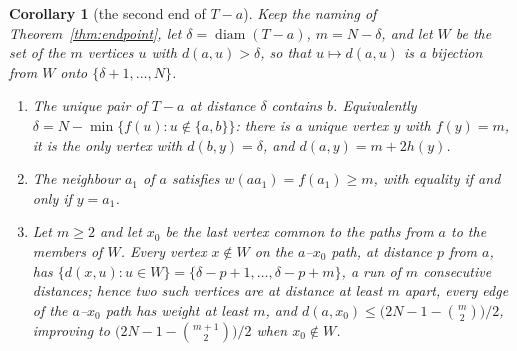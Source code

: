 \documentclass[11pt,a4paper]{article}
\theoremstyle{plain}
\newtheorem{corollary}[theorem]{Corollary}
\theoremstyle{remark}
\newcommand{\bin}[2]{\binom{#1}{#2}}
\newcommand{\diam}{\operatorname{diam}}
\begin{document}
\begin{corollary}[the second end of $T-a$]\label{cor:secondend}
Keep the naming of Theorem~\ref{thm:endpoint}, let $\delta=\diam(T-a)$,
$m=N-\delta$, and let $W$ be the set of the $m$ vertices $u$ with
$d(a,u)>\delta$, so that $u\mapsto d(a,u)$ is a bijection from $W$ onto
$\{\delta+1,\dots,N\}$.
\begin{enumerate}
\item[(a)] The unique pair of $T-a$ at distance $\delta$ contains $b$.
Equivalently $\delta=N-\min\{f(u):u\notin\{a,b\}\}$: there is a unique vertex
$y$ with $f(y)=m$, it is the only vertex with $d(b,y)=\delta$, and
$d(a,y)=m+2h(y)$.
\item[(b)] The neighbour $a_1$ of $a$ satisfies $w(aa_1)=f(a_1)\ge m$, with
equality if and only if $y=a_1$.
\item[(c)] Let $m\ge2$ and let $x_0$ be the last vertex common to the paths
from $a$ to the members of $W$.  Every vertex $x\notin W$ on the $a$--$x_0$
path, at distance $p$ from $a$, has $\{d(x,u):u\in W\}=
\{\delta-p+1,\dots,\delta-p+m\}$, a run of $m$ consecutive distances; hence
two such vertices are at distance at least $m$ apart, every edge of the
$a$--$x_0$ path has weight at least $m$, and
$d(a,x_0)\le\bigl(2N-1-\bin m2\bigr)/2$, improving to
$\bigl(2N-1-\bin{m+1}2\bigr)/2$ when $x_0\notin W$.
\end{enumerate}
\end{corollary}
\end{document}
